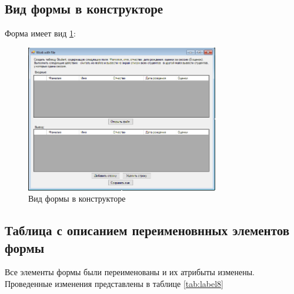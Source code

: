 \subsection{Вид формы в конструкторе}

Форма имеет вид \ref{fig:FormInConstruct8}:

\begin{figure}[!h]
    \centering
    \includegraphics[width = 0.75\textwidth]{images/Task8/FormInConstructor.png}
    \caption{Вид формы в конструкторе}
    \label{fig:FormInConstruct8}
\end{figure}


\subsection{Таблица с описанием переименовнных элементов формы}

Все элементы формы были переименованы и их атрибыты изменены. Проведенные изменения представлены в таблице \ref{tab:label8}

